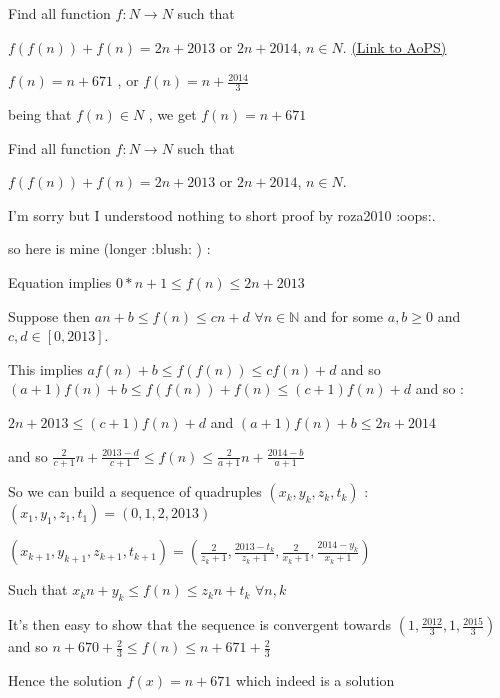\begin{problem}
	Find all function $f:N\rightarrow N$  such that  

$ f(f(n))+f(n)=2n +2013$  or  $2n +2014$,  $n\in N.$
	\flushright \href{https://artofproblemsolving.com/community/c6h534883}{(Link to AoPS)}
\end{problem}



\begin{solution}
	$f(n)=n+671$ , or $f(n)=n+\frac{2014}{3}$

being that $f(n)\in N$ , we get $\boxed{f(n)=n+671}$
\end{solution}



\begin{solution}
	\begin{tcolorbox}Find all function $f:N\rightarrow N$  such that  

$ f(f(n))+f(n)=2n +2013$  or  $2n +2014$,  $n\in N.$\end{tcolorbox}
I'm sorry but I understood nothing to short proof by roza2010 :oops:.

so here is mine (longer :blush: ) :

Equation implies $0*n+1\le f(n)\le 2n+2013$

Suppose then $an+b\le f(n)\le cn+d$ $\forall n\in\mathbb N$ and for some $a,b\ge 0$ and $c,d\in[0,2013]$.

This implies $af(n)+b\le f(f(n))\le cf(n)+d$ and so $(a+1)f(n)+b\le f(f(n))+f(n)\le (c+1)f(n)+d$ and so :

$2n+2013\le(c+1)f(n)+d$ and $(a+1)f(n)+b\le 2n+2014$

and so $\frac 2{c+1}n+\frac{2013-d}{c+1}\le f(n)\le \frac 2{a+1}n+ \frac{2014-b}{a+1}$

So we can build a sequence of quadruples $(x_k,y_k,z_k, t_k)$ :
$(x_1,y_1,z_1,t_1)=(0,1,2,2013)$

$(x_{k+1},y_{k+1},z_{k+1}, t_{k+1})=(\frac 2{z_k+1},\frac{2013-t_k}{z_k+1},\frac 2{x_k+1},\frac{2014-y_k}{x_k+1})$

Such that $x_kn+y_k\le f(n)\le z_kn+t_k$ $\forall n,k$

It's then easy to show that the sequence is convergent towards $(1,\frac{2012}3,1,\frac{2015}3)$ and so $n+670+\frac 23\le f(n)\le n+671+\frac 23$

Hence the solution $\boxed{f(x)=n+671}$ which indeed is a solution
\end{solution}



